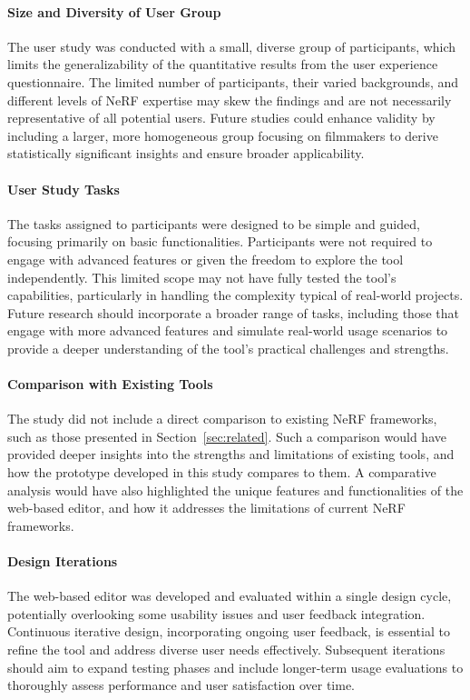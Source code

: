 \paragraph{Size and Diversity of User Group}
The user study was conducted with a small, diverse group of participants, which limits the generalizability of the quantitative results from the user experience questionnaire.
The limited number of participants, their varied backgrounds, and different levels of NeRF expertise may skew the findings and are not necessarily representative of all potential users.
Future studies could enhance validity by including a larger, more homogeneous group focusing on filmmakers to derive statistically significant insights and ensure broader applicability.

\paragraph{User Study Tasks}
The tasks assigned to participants were designed to be simple and guided, focusing primarily on basic functionalities.
Participants were not required to engage with advanced features or given the freedom to explore the tool independently.
This limited scope may not have fully tested the tool's capabilities, particularly in handling the complexity typical of real-world projects.
Future research should incorporate a broader range of tasks, including those that engage with more advanced features and simulate real-world usage scenarios to provide a deeper understanding of the tool’s practical challenges and strengths.

\paragraph{Comparison with Existing Tools}
The study did not include a direct comparison to existing NeRF frameworks, such as those presented in Section~\ref{sec:related}.
Such a comparison would have provided deeper insights into the strengths and limitations of existing tools, and how the prototype developed in this study compares to them.
A comparative analysis would have also highlighted the unique features and functionalities of the web-based editor, and how it addresses the limitations of current NeRF frameworks.

\paragraph{Design Iterations}
The web-based editor was developed and evaluated within a single design cycle, potentially overlooking some usability issues and user feedback integration.
Continuous iterative design, incorporating ongoing user feedback, is essential to refine the tool and address diverse user needs effectively.
Subsequent iterations should aim to expand testing phases and include longer-term usage evaluations to thoroughly assess performance and user satisfaction over time.

